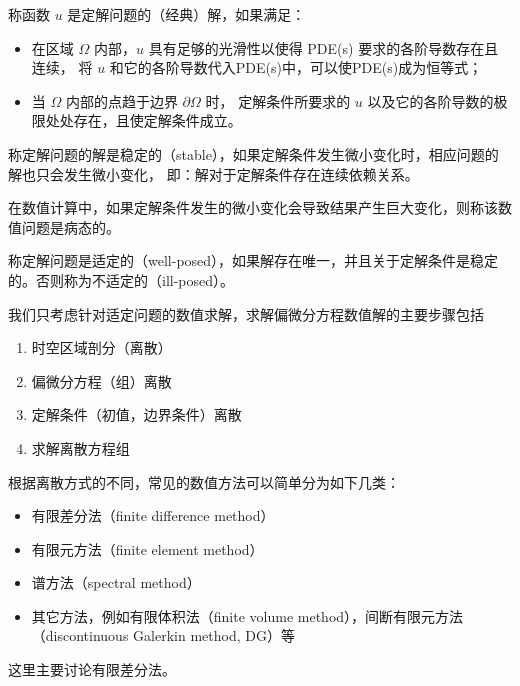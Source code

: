 \begin{definition}
    称函数 $u$ 是定解问题的（经典）解，如果满足：
    \begin{itemize}
        \item 在区域 $\Omega$ 内部，$u$ 具有足够的光滑性以使得 PDE(s) 要求的各阶导数存在且连续，
              将 $u$ 和它的各阶导数代入PDE(s)中，可以使PDE(s)成为恒等式；
        \item 当 $\Omega$ 内部的点趋于边界 $\partial \Omega$ 时，
              定解条件所要求的 $u$ 以及它的各阶导数的极限处处存在，且使定解条件成立。
    \end{itemize}
\end{definition}

\begin{definition}
    称定解问题的解是稳定的（stable），如果定解条件发生微小变化时，相应问题的解也只会发生微小变化，
    即：解对于定解条件存在连续依赖关系。
\end{definition}

\begin{remark}
    在数值计算中，如果定解条件发生的微小变化会导致结果产生巨大变化，则称该数值问题是病态的。
\end{remark}

\begin{definition}
    称定解问题是适定的（well-posed），如果解存在唯一，并且关于定解条件是稳定的。否则称为不适定的（ill-posed）。
\end{definition}



我们只考虑针对适定问题的数值求解，求解偏微分方程数值解的主要步骤包括
\begin{enumerate}
    \item 时空区域剖分（离散）
    \item 偏微分方程（组）离散
    \item 定解条件（初值，边界条件）离散
    \item 求解离散方程组
\end{enumerate}
根据离散方式的不同，常见的数值方法可以简单分为如下几类：
\begin{itemize}
    \item 有限差分法（finite difference method）
    \item 有限元方法（finite element method）
    \item 谱方法（spectral method）
    \item 其它方法，例如有限体积法（finite volume method），间断有限元方法（discontinuous Galerkin method, DG）等
\end{itemize}
这里主要讨论有限差分法。



